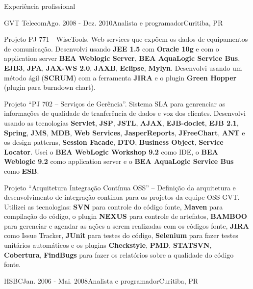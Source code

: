 \documentclass{resume}
\begin{document}
\begin{rSection}{Experiência profissional}
\begin{rSubsection}{GVT Telecom}{Ago. 2008 - Dez. 2010}{Analista e programador}{Curitiba, PR}
    \item Projeto PJ 771 - WiseTools. Web services que expõem os dados de equipamentos de comunicação. Desenvolvi usando \textbf{JEE 1.5} com \textbf{Oracle 10g} e com o application server \textbf{BEA Weblogic Server}, \textbf{BEA AquaLogic Service Bus}, \textbf{EJB3}, \textbf{JPA}, \textbf{JAX-WS 2.0}, \textbf{JAXB}, \textbf{Eclipse}, \textbf{Mylyn}. Desenvolvi usando um método ágil (\textbf{SCRUM}) com a ferramenta \textbf{JIRA} e o plugin \textbf{Green Hopper} (plugin para burndown chart).\\
    \item Projeto “PJ 702 – Serviços de Gerência”. Sistema SLA para genrenciar as informações de qualidade de tranferência de dados e voz dos clientes. Desenvolvi usando as tecnologias \textbf{Servlet}, \textbf{JSP}, \textbf{JSTL}, \textbf{AJAX}, \textbf{EJB-doclet}, \textbf{EJB 2.1}, \textbf{Spring}, \textbf{JMS}, \textbf{MDB}, \textbf{Web Services}, \textbf{JasperReports}, \textbf{JFreeChart}, \textbf{ANT} e os design patterns, \textbf{Session Facade}, \textbf{DTO}, \textbf{Business Object}, \textbf{Service Locator}. Usei o \textbf{BEA WebLogic Workshop 9.2} como IDE, o \textbf{BEA Weblogic 9.2} como application server e o \textbf{BEA AquaLogic Service Bus} como \textbf{ESB}.\\
    \item Projeto “Arquitetura Integração Contínua OSS” – Definição da arquitetura e desenvolvimento de integração continua para os projetos da equipe OSS-GVT. Utilizei as tecnologias: \textbf{SVN} para controle do código fonte, \textbf{Maven} para compilação do código, o plugin \textbf{NEXUS} para controle de artefatos, \textbf{BAMBOO} para gerenciar e agendar as ações a serem realizadas com os códigos fonte, \textbf{JIRA} como Issue Tracker, \textbf{JUnit} para testes do código, \textbf{Selenium} para fazer testes unitários automáticos e os plugins \textbf{Checkstyle}, \textbf{PMD}, \textbf{STATSVN}, \textbf{Cobertura}, \textbf{FindBugs} para fazer os relatórios sobre a qualidade do código fonte.
    \end{rSubsection}
    \begin{rSubsection}{HSBC}{Jan. 2006 - Mai. 2008}{Analista e programador}{Curitiba, PR}

\end{rSubsection}
\end{rSection}
\end{document}
